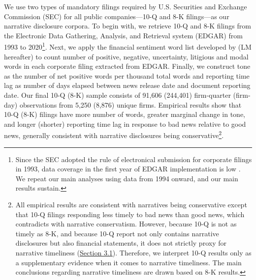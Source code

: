 \documentclass[a4paper]{article}
\begin{document}
\begin{spacing}{2}
We use two types of mandatory filings required by U.S. Securities and Exchange Commission (SEC) for all public companies---10-Q and 8-K filings---as our narrative disclosure corpora. To begin with, we retrieve 10-Q and 8-K filings from the Electronic Data Gathering, Analysis, and Retrieval system (EDGAR) from 1993 to 2020\footnote{Since the SEC adopted the rule of electronical submission for corporate filings in 1993, data coverage in the first year of EDGAR implementation is low \citep*{gaoInformingMarketEffect2020}. We repeat our main analyses using data from 1994 onward, and our main results sustain.}. Next, we apply the financial sentiment word list developed by \citet*{loughranWhenLiabilityNot2011} (LM hereafter) to count number of positive, negative, uncertainty, litigious and modal words in each corporate filing extracted from EDGAR. Finally, we construct tone as the number of net positive words per thousand total words and reporting time lag as number of days elapsed between news release date and document reporting date. Our final 10-Q (8-K) sample consists of 91,606 (244,401) firm-quarter (firm-day) observations from 5,250 (8,876) unique firms. Empirical results show that 10-Q (8-K) filings have more number of words, greater marginal change in tone, and longer (shorter) reporting time lag in response to bad news relative to good news, generally consistent with narrative disclosures being conservative\footnote{All empirical results are consistent with narratives being conservative except that 10-Q filings responding less timely to bad news than good news, which contradicts with narrative conservatism. However, because 10-Q is not as timely as 8-K, and because 10-Q report not only contains narrative disclosures but also financial statements, it does not strictly proxy for narrative timeliness (\hyperref[sec3.1]{Section 3.1}). Therefore, we interpret 10-Q results only as a supplementary evidence when it comes to narrative timeliness. The main conclusions regarding narrative timeliness are drawn based on 8-K results.}. 



\end{spacing}
\end{document}
